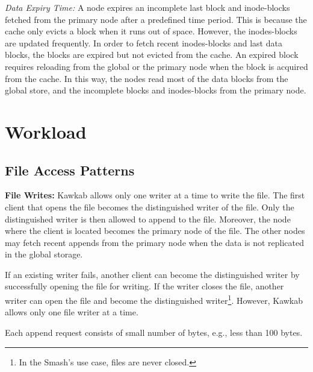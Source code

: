 \documentclass[]{article}
\newcommand{\subtopic}[1]{\vspace{1.5pt} \noindent \textbf{#1}}
\begin{document}
\textit{Data Expiry Time:} A node expires an incomplete last block and inode-blocks
fetched from the primary node after a predefined time period. 
This is because the cache only evicts a block when it runs out of space. However,
the inodes-blocks are updated frequently. In order to fetch recent inodes-blocks
and last data blocks, the blocks are expired but not evicted from the cache.
An expired block requires reloading from the global or the primary node when
the block is acquired from the cache. In this way, the nodes read most of the
data blocks from the global store, and the incomplete blocks and inodes-blocks
from the primary node.



%


\section{Workload}

\subsection{File Access Patterns}

\subtopic{File Writes:} Kawkab allows only one writer at a time to
write the file. The first client that opens the file becomes the distinguished
writer of the file. Only the distinguished writer is then allowed to append to
the file. Moreover, the node where the client is located becomes the primary
node of the file.  The other nodes may fetch recent appends from the primary
node when the data is not replicated in the global storage.

If an existing writer fails, another client can become the distinguished writer
by successfully opening the file for writing. If the writer closes the file,
another writer can open the file and become the distinguished
writer\footnote{In the Smash's use case, files are never closed.}. However,
Kawkab allows only one file writer at a time.

Each append request consists of small number of bytes, e.g., less than 100 bytes.
\end{document}
